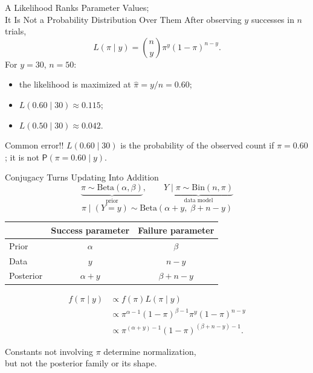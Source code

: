 \documentclass[aspectratio=43,11pt]{beamer}
\newcommand{\prob}{\mathsf{P}}
\begin{document}
{  %
  \begin{frame}{A Likelihood Ranks Parameter Values;\\
    It Is Not a Probability Distribution Over Them}
    After observing $y$ successes in $n$ trials,
    \[
    L(\pi\mid y)=\binom{n}{y}\pi^y(1-\pi)^{n-y}.
    \]
    For $y=30$, $n=50$:
    \begin{itemize}
      \item the likelihood is maximized at $\hat\pi=y/n=0.60$;
      \item $L(0.60\mid30)\approx0.115$;
      \item $L(0.50\mid30)\approx0.042$.
    \end{itemize}
    \begin{alertblock}{Common error!!}
      $L(0.60\mid30)$ is the probability of the observed count if $\pi=0.60$; it is not $\prob(\pi=0.60\mid y)$.
    \end{alertblock}
  \end{frame}
}

\begin{frame}{Conjugacy Turns Updating Into Addition}
  \[
  \underbrace{\pi\sim\mathrm{Beta}(\alpha,\beta)}_{\text{prior}},\qquad
  \underbrace{Y\mid\pi\sim\mathrm{Bin}(n,\pi)}_{\text{data model}}
  \]
  \[
  \boxed{\pi\mid(Y=y)\sim\mathrm{Beta}(\alpha+y,\;\beta+n-y)}
  \]
  \begin{center}
    \begin{tabular}{lcc}
      \toprule
      & Success parameter & Failure parameter\\
      \midrule
      Prior & $\alpha$ & $\beta$\\
      Data & $y$ & $n-y$\\
      Posterior & $\alpha+y$ & $\beta+n-y$\\
      \bottomrule
    \end{tabular}
  \end{center}
\end{frame}

\begin{frame}{}
  \begin{align*}
    f(\pi\mid y)
    &\propto f(\pi)L(\pi\mid y)\\
    &\propto \pi^{\alpha-1}(1-\pi)^{\beta-1}
    \pi^{y}(1-\pi)^{n-y}\\
    &\propto \pi^{(\alpha+y)-1}(1-\pi)^{(\beta+n-y)-1}.
  \end{align*}
  \begin{block}{}
    Constants not involving $\pi$ determine normalization,\\
    but not the posterior family or its shape.
  \end{block}
\end{frame}
\end{document}
